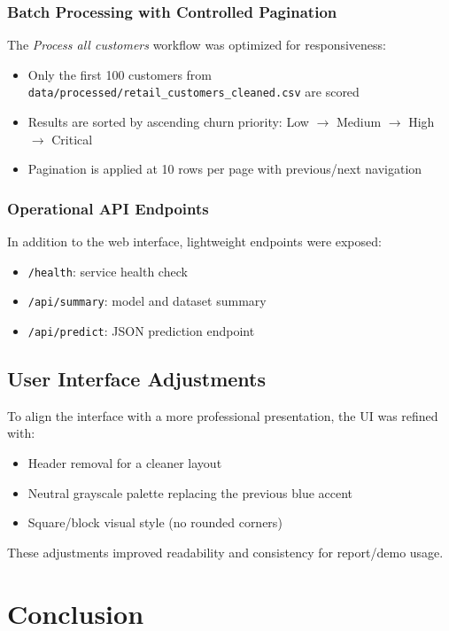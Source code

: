 \documentclass[12pt,a4paper]{article}
\begin{document}
\subsubsection{Batch Processing with Controlled Pagination}
The \textit{Process all customers} workflow was optimized for responsiveness:
\begin{itemize}
    \item Only the first 100 customers from \texttt{data/processed/retail\_customers\_cleaned.csv} are scored
    \item Results are sorted by ascending churn priority: Low $\rightarrow$ Medium $\rightarrow$ High $\rightarrow$ Critical
    \item Pagination is applied at 10 rows per page with previous/next navigation
\end{itemize}

\subsubsection{Operational API Endpoints}
In addition to the web interface, lightweight endpoints were exposed:
\begin{itemize}
    \item \texttt{/health}: service health check
    \item \texttt{/api/summary}: model and dataset summary
    \item \texttt{/api/predict}: JSON prediction endpoint
\end{itemize}

\subsection{User Interface Adjustments}

To align the interface with a more professional presentation, the UI was refined with:
\begin{itemize}
    \item Header removal for a cleaner layout
    \item Neutral grayscale palette replacing the previous blue accent
    \item Square/block visual style (no rounded corners)
\end{itemize}

These adjustments improved readability and consistency for report/demo usage.

\section{Conclusion}
\end{document}

